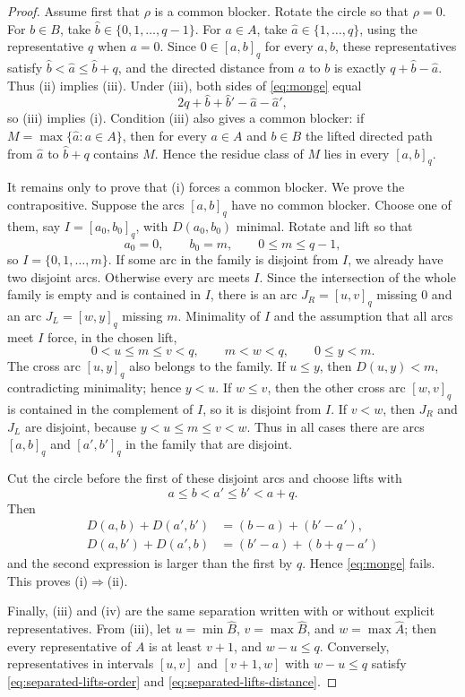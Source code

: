 \documentclass[11pt]{article}
\theoremstyle{definition}
\theoremstyle{remark}
\begin{document}
\begin{proof}
Assume first that $\rho$ is a common blocker.  Rotate the circle so that $\rho=0$.  For $b\in B$, take $\widehat b\in\{0,1,\ldots,q-1\}$.  For $a\in A$, take $\widehat a\in\{1,\ldots,q\}$, using the representative $q$ when $a=0$.  Since $0\in[a,b]_q$ for every $a,b$, these representatives satisfy $\widehat b<\widehat a\le\widehat b+q$, and the directed distance from $a$ to $b$ is exactly $q+\widehat b-\widehat a$.  Thus (ii) implies (iii).  Under (iii), both sides of \eqref{eq:monge} equal
\[
        2q+\widehat b+\widehat b'-\widehat a-\widehat a',
\]
so (iii) implies (i).  Condition (iii) also gives a common blocker: if $M=\max\{\widehat a:a\in A\}$, then for every $a\in A$ and $b\in B$ the lifted directed path from $\widehat a$ to $\widehat b+q$ contains $M$.  Hence the residue class of $M$ lies in every $[a,b]_q$.

It remains only to prove that (i) forces a common blocker.  We prove the contrapositive.  Suppose the arcs $[a,b]_q$ have no common blocker.  Choose one of them, say $I=[a_0,b_0]_q$, with $D(a_0,b_0)$ minimal.  Rotate and lift so that
\[
        a_0=0,
        \qquad b_0=m,
        \qquad 0\le m\le q-1,
\]
so $I=\{0,1,\ldots,m\}$.  If some arc in the family is disjoint from $I$, we already have two disjoint arcs.  Otherwise every arc meets $I$.  Since the intersection of the whole family is empty and is contained in $I$, there is an arc $J_R=[u,v]_q$ missing $0$ and an arc $J_L=[w,y]_q$ missing $m$.  Minimality of $I$ and the assumption that all arcs meet $I$ force, in the chosen lift,
\[
        0<u\le m\le v<q,
        \qquad
        m<w<q,
        \qquad
        0\le y<m .
\]
The cross arc $[u,y]_q$ also belongs to the family.  If $u\le y$, then $D(u,y)<m$, contradicting minimality; hence $y<u$.  If $w\le v$, then the other cross arc $[w,v]_q$ is contained in the complement of $I$, so it is disjoint from $I$.  If $v<w$, then $J_R$ and $J_L$ are disjoint, because $y<u\le m\le v<w$.  Thus in all cases there are arcs $[a,b]_q$ and $[a',b']_q$ in the family that are disjoint.

Cut the circle before the first of these disjoint arcs and choose lifts with
\[
        a\le b<a'\le b'<a+q .
\]
Then
\[
\begin{aligned}
        D(a,b)+D(a',b')&=(b-a)+(b'-a'),\\
        D(a,b')+D(a',b)&=(b'-a)+(b+q-a')
\end{aligned}
\]
and the second expression is larger than the first by $q$.  Hence \eqref{eq:monge} fails.  This proves (i)$\Rightarrow$(ii).

Finally, (iii) and (iv) are the same separation written with or without explicit representatives.  From (iii), let $u=\min\widehat B$, $v=\max\widehat B$, and $w=\max\widehat A$; then every representative of $A$ is at least $v+1$, and $w-u\le q$.  Conversely, representatives in intervals $[u,v]$ and $[v+1,w]$ with $w-u\le q$ satisfy \eqref{eq:separated-lifts-order} and \eqref{eq:separated-lifts-distance}.
\end{proof}
\end{document}
